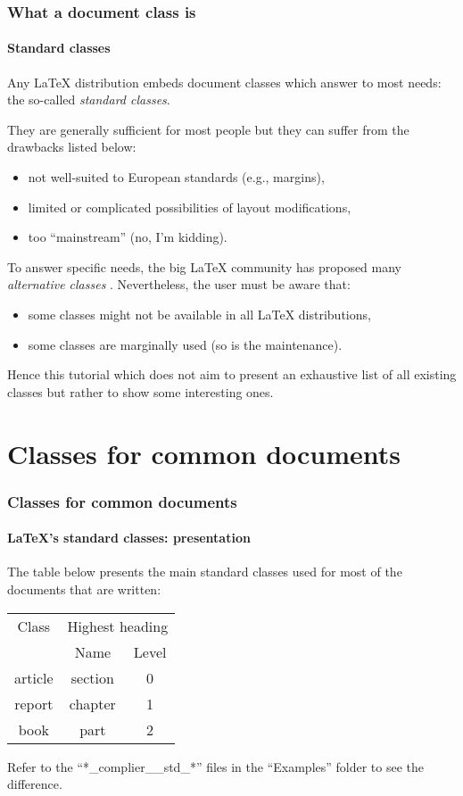 \documentclass[11pt]{beamer}
\begin{document}
\begin{frame}
	\frametitle{What a document class is}
	\framesubtitle{Standard classes}
	
	Any \LaTeX{} distribution embeds document classes which answer to most needs: the so-called \emph{standard classes}.
	
	They are generally sufficient for most people but they can suffer from the drawbacks listed below:
	\begin{itemize}
		\item not well-suited to European standards (e.g., margins),
		\item limited or complicated possibilities of layout modifications,
		\item too \enquote{mainstream} (no, I'm kidding).
	\end{itemize}


	To answer specific needs, the big \LaTeX{} community has proposed many \emph{alternative classes} \cite{CTAN_Class}.
	Nevertheless, the user must be aware that:
	\begin{itemize}
		\item some classes might not be available in all \LaTeX{} distributions,
		\item some classes are marginally used (so is the maintenance).
	\end{itemize}

	Hence this tutorial which does not aim to present an exhaustive list of all existing classes but rather to show some interesting ones.
\end{frame}


\section{Classes for common documents}

\begin{frame}
	\frametitle{Classes for common documents}
	\framesubtitle{\LaTeX{}'s standard classes: presentation}
	
	The table below presents the main standard classes used for most of the documents that are written:
	\begin{table}[h]
		\begin{tabular}{*{3}{c}}
			\toprule
			 Class  & \multicolumn{2}{c}{Highest heading} \\ \cmidrule{2-3}
			        &      Name       &     Level     \\ \midrule
			article &     section     &       0       \\
			report  &     chapter     &       1       \\
			 book   &      part       &       2       \\ \bottomrule
		\end{tabular}
	\end{table}
	Refer to the \enquote{*\_complier\_\_std\_*} files in the \enquote{Examples} folder to see the difference.
\end{frame}
\end{document}
